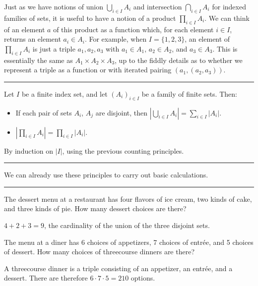 \documentclass[letterpaper,10pt,english]{sphinxmanual}
\begin{document}
\sphinxAtStartPar
Just as we have notions of union \(\bigcup_{i\in I} A_i\) and intersection \(\bigcap_{i \in I} A_i\) for indexed families of sets, it is useful to have a notion of a product \(\prod_{i \in I} A_i\). We can think of an element \(a\) of this product as a function which, for each element \(i \in I\), returns an element \(a_i \in A_i\). For example, when \(I = \{1, 2, 3\}\), an element of \(\prod_{i \in I} A_i\) is just a triple \(a_1, a_2, a_3\) with \(a_1 \in A_1\), \(a_2 \in A_2\), and \(a_3 \in A_3\). This is essentially the same as \(A_1 \times A_2 \times A_3\), up to the fiddly details as to whether we represent a triple as a function or with iterated pairing \((a_1, (a_2, a_3))\).


\bigskip\hrule\bigskip


\sphinxAtStartPar
{} Let \(I\) be a finite index set, and let \((A_i)_{i \in I}\) be a family of finite sets. Then:
\begin{itemize}
\item {} 
\sphinxAtStartPar
If each pair of sets \(A_i\), \(A_j\) are disjoint, then \(|\bigcup_{i \in I} A_i| = \sum_{i \in I} | A_i |\).

\item {} 
\sphinxAtStartPar
\(| \prod_{i \in I} A_i | = \prod_{i \in I} | A_i |\).

\end{itemize}

\sphinxAtStartPar
{} By induction on \(|I|\), using the previous counting principles.


\bigskip\hrule\bigskip


\sphinxAtStartPar
We can already use these principles to carry out basic calculations.


\bigskip\hrule\bigskip


\sphinxAtStartPar
{} The dessert menu at a restaurant has four flavors of ice cream, two kinds of cake, and three kinds of pie. How many dessert choices are there?

\sphinxAtStartPar
{} \(4 + 2 + 3 = 9\), the cardinality of the union of the three disjoint sets.

\sphinxAtStartPar
{} The menu at a diner has 6 choices of appetizers, 7 choices of entrée, and 5 choices of dessert. How many choices of three\sphinxhyphen{}course dinners are there?

\sphinxAtStartPar
{} A three\sphinxhyphen{}course dinner is a triple consisting of an appetizer, an entrée, and a dessert. There are therefore \(6 \cdot 7 \cdot 5 = 210\) options.
\end{document}
